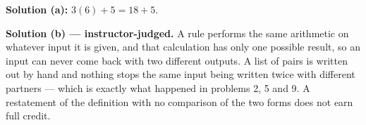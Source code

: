 \documentclass[12pt]{article}
\begin{document}

\textbf{Solution (a):} $3(6) + 5 = 18 + 5$. 

\textbf{Solution (b) --- instructor-judged.} A rule performs the same
arithmetic on whatever input it is given, and that calculation has only one
possible result, so an input can never come back with two different outputs. A
list of pairs is written out by hand and nothing stops the same input being
written twice with different partners --- which is exactly what happened in
problems 2, 5 and 9. A restatement of the definition with no comparison of the
two forms does not earn full credit.
\end{document}
